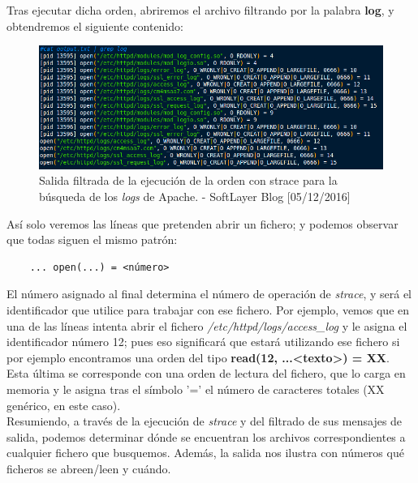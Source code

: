 Tras ejecutar dicha orden, abriremos el archivo filtrando por la palabra \textbf{log}, y obtendremos el siguiente contenido:
\begin{figure}[H]
	\centering
	\includegraphics[scale=0.6]{strace}
	\caption{Salida filtrada de la ejecución de la orden con strace para la búsqueda de los \emph{logs} de Apache. - SoftLayer Blog [05/12/2016]}
	\label{figura4}
\end{figure}
Así solo veremos las líneas que pretenden abrir un fichero; y podemos observar que todas siguen el mismo patrón: 
\begin{verbatim}
	... open(...) = <número>
\end{verbatim}
El número asignado al final determina el número de operación de \emph{strace}, y será el identificador que utilice para trabajar con ese fichero. Por ejemplo, vemos que en una de las líneas intenta abrir el fichero \emph{/etc/httpd/logs/access\_log} y le asigna el identificador número 12; pues eso significará que estará utilizando ese fichero si por ejemplo encontramos una orden del tipo \textbf{read(12, ...<texto>) = XX}. Esta última se corresponde con una orden de lectura del fichero, que lo carga en memoria y le asigna tras el símbolo '=' el número de caracteres totales (XX genérico, en este caso). \\
Resumiendo, a través de la ejecución de \emph{strace} y del filtrado de sus mensajes de salida, podemos determinar dónde se encuentran los archivos correspondientes a cualquier fichero que busquemos. Además, la salida nos ilustra con números qué ficheros se abreen/leen y cuándo.


